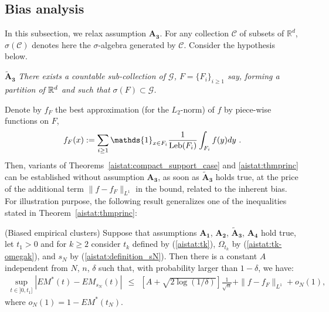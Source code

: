 \subsection{Bias analysis}
\label{aistat:biais}
In this subsection, we relax assumption $\mathbf{A_3}$. For any collection $\mathcal{C}$ of subsets of $\mathbb{R}^d$, $\sigma(\mathcal{C})$ denotes here the $\sigma$-algebra generated by $\mathcal{C}$.
Consider the hypothesis below.

\noindent
$\mathbf{\tilde A_3}$  {\it There exists a countable sub-collection of $\mathcal{G}$, $F=\{F_i\}_{i \ge 1}$ say, forming a partition of $\mathbb{R}^d$ and such that $\sigma (F) \subset \mathcal{G}$.} 

 Denote by $f_{F}$ the best approximation (for the $L_2$-norm) of $f$ by piece-wise functions on $F$, $$f_{F}(x) := \sum_{i \ge 1} \mathds{1}_{x \in F_i} \frac{1}{\leb(F_i)} \int_{F_i}f(y)dy~.$$
Then, variants of Theorems~\ref{aistat:compact_support_case} and \ref{aistat:thmprinc} can be established without assumption $\mathbf{A_3}$, as soon as $\mathbf{\tilde A_3}$ holds true, at the price of the additional term $\|f-f_{F}\|_{L^1}$ in the bound, related to the inherent bias. For illustration purpose, the following result generalizes one of the inequalities stated in Theorem~\ref{aistat:thmprinc}:

\begin{theorem}({\sc Biased empirical clusters})
\label{aistat:thmprincbiais}
Suppose that assumptions $\mathbf{A_1}$, $\mathbf{A_2}$,
$\mathbf{\tilde A_3}$, $\mathbf{A_4}$ hold true, let $t_1>0$ and for $k \ge 2$ consider $t_k$ defined by (\ref{aistat:tk}), $\Omega_{t_k}$ by (\ref{aistat:tk-omegak}), and $s_N$ by (\ref{aistat:definition_sN}). Then there is a constant $A$ independent from $N$, $n$, $\delta$ such that, with probability larger than $1-\delta$, we have: 
\begin{align*}
\sup_{t \in ]0,t_1]}|EM^*(t)-EM_{s_N}(t)| ~~\le~~ \left[A+\sqrt{2\log(1/\delta)}\right]\frac{1}{\sqrt n} + \|f-f_{F}\|_{L^1}  + o_N(1), 
\end{align*}
where $o_N(1)=1-EM^*(t_N)$. 
\end{theorem}

